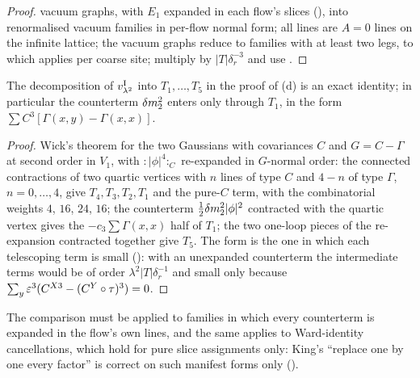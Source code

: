 \begin{proof}
vacuum graphs, with $E_1$ expanded in each flow's slices (), into renormalised vacuum families in per-flow normal form; all lines are $A=0$ lines on the infinite lattice; the vacuum graphs reduce to families with at least two legs, to which  applies per coarse site; multiply by $|T|\delta_r^{-3}$ and use .
\end{proof}

\begin{proposition}\label{rot:prop:V2}
The decomposition of $v^{\rm I}_{\lambda^2}$ into $T_1,\dots,T_5$ in the proof of (d) is an exact identity; in particular the counterterm $\delta m^2_2$ enters only through $T_1$, in the form $\sum C^3[\Gamma(x,y)-\Gamma(x,x)]$.
\end{proposition}
\begin{proof}
Wick's theorem for the two Gaussians with covariances $C$ and $G=C-\Gamma$ at second order in $V_1$, with ${:}|\phi|^4{:}_C$ re-expanded in $G$-normal order: the connected contractions of two quartic vertices with $n$ lines of type $C$ and $4-n$ of type $\Gamma$, $n=0,\dots,4$, give $T_4,T_3,T_2,T_1$ and the pure-$C$ term, with the combinatorial weights $4$, $16$, $24$, $16$; the counterterm $\frac12\delta m^2_2|\phi|^2$ contracted with the quartic vertex gives the $-c_3\sum\Gamma(x,x)$ half of $T_1$; the two one-loop pieces of the re-expansion contracted together give $T_5$. The form is the one in which each telescoping term is small (): with an unexpanded counterterm the intermediate terms would be of order $\lambda^2|T|\delta_r^{-1}$ and small only because $\sum_y\varepsilon^3(C^{X3}-(C^Y\circ\tau)^3)=0$.
\end{proof}

\begin{remark}\label{rot:rem:tele}
The comparison must be applied to families in which every counterterm is expanded in the flow's own lines, and the same applies to Ward-identity cancellations, which hold for pure slice assignments only: King's ``replace one by one every factor'' \cite[p.~665]{K1} is correct on such manifest forms only ().
\end{remark}


